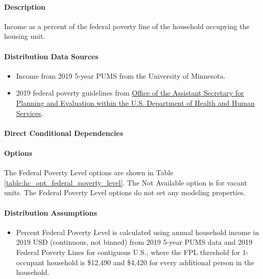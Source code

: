 \paragraph{Description}
% 
Income as a percent of the federal poverty line of the household occupying the housing unit.

\paragraph{Distribution Data Sources}
% 
\begin{itemize}
\item
  Income from 2019 5-year PUMS from the University of Minnesota.
\item
  2019 federal poverty guidelines from \href{https://aspe.hhs.gov/topics/poverty-economic-mobility/poverty-guidelines/prior-hhs-poverty-guidelines-federal-register-references/2019-poverty-guidelines}{Office of the Assistant Secretary for Planning and Evaluation within the U.S. Department of Health and Human Services}.
\end{itemize}

\paragraph{Direct Conditional Dependencies}


\paragraph{Options}
The Federal Poverty Level options are shown in Table \ref{table:hc_opt_federal_poverty_level}. The Not Available option is for vacant units. The Federal Poverty Level options do not set any modeling properties.



\paragraph{Distribution Assumptions}
% 
\begin{itemize}
\item
  Percent Federal Poverty Level is calculated using annual household income
  in 2019 USD (continuous, not binned) from 2019 5-year PUMS data and 2019
  Federal Poverty Lines for contiguous U.S., where the FPL threshold for
  1-occupant household is \$12,490 and \$4,420 for every additional person
  in the household.
\end{itemize}
